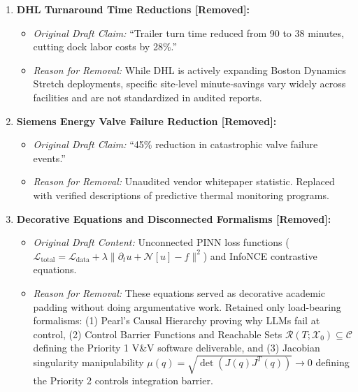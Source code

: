 \documentclass[11pt,a4paper]{article}
\begin{document}
\begin{enumerate}
    \item \textbf{DHL Turnaround Time Reductions [Removed]:}
    \begin{itemize}
        \item \textit{Original Draft Claim:} ``Trailer turn time reduced from 90 to 38 minutes, cutting dock labor costs by 28\%.''
        \item \textit{Reason for Removal:} While DHL is actively expanding Boston Dynamics Stretch deployments, specific site-level minute-savings vary widely across facilities and are not standardized in audited reports.
    \end{itemize}

    \item \textbf{Siemens Energy Valve Failure Reduction [Removed]:}
    \begin{itemize}
        \item \textit{Original Draft Claim:} ``45\% reduction in catastrophic valve failure events.''
        \item \textit{Reason for Removal:} Unaudited vendor whitepaper statistic. Replaced with verified descriptions of predictive thermal monitoring programs.
    \end{itemize}

    \item \textbf{Decorative Equations and Disconnected Formalisms [Removed]:}
    \begin{itemize}
        \item \textit{Original Draft Content:} Unconnected PINN loss functions ($\mathcal{L}_{\text{total}} = \mathcal{L}_{\text{data}} + \lambda \|\partial_t u + \mathcal{N}[u] - f\|^2$) and InfoNCE contrastive equations.
        \item \textit{Reason for Removal:} These equations served as decorative academic padding without doing argumentative work. Retained only load-bearing formalisms: (1) Pearl's Causal Hierarchy proving why LLMs fail at control, (2) Control Barrier Functions and Reachable Sets $\mathcal{R}(T; \mathcal{X}_0) \subseteq \mathcal{C}$ defining the Priority 1 V\&V software deliverable, and (3) Jacobian singularity manipulability $\mu(q) = \sqrt{\det(J(q)J^T(q))} \to 0$ defining the Priority 2 controls integration barrier.
    \end{itemize}
\end{enumerate}
\end{document}

